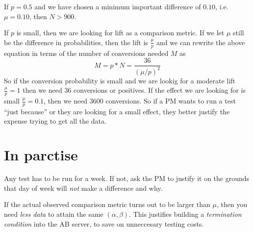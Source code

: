 \documentclass[letterpaper,12pt]{article}
\newcommand{\beq}{\begin{equation}} %
\newcommand{\eeq}{\end{equation}} %
\begin{document}
If \(p=0.5\) and we have chosen a minimum important difference of \(0.10\), i.e. \(\mu = 0.10\), then \(N>900\).

If \(p\) is small, then we are looking for lift as a comparison metric. If we let \(\mu\) still be the difference in probabilities, then the lift is \(\frac{\mu}{p}\) and we can rewrite the above equation in terms of the number of conversions needed \(M\) as
\beq
M=p*N=\frac{36}{(\mu/p)^2}
\eeq
So if the conversion probability is small and we are lookig for a
moderate lift \(\frac{\mu}{p}=1\) then we need 36 conversions or
positives. If the effect we are looking for is small
\(\frac{\mu}{p}=0.1\), then we need \(3600\) conversions. So if a PM
wants to run a test ``just because'' or they are looking for a small
effect, they better justify the expense trying to get all the data.

\section{In parctise}
Any test has to be run for a week. If not, ask the PM to justify it on the grounds that day of week will {\em not} make a difference and why.

If the actual observed comparison metric turns out to be larger than \(\mu\), then you need {\em less data} to attain the same \((\alpha,\beta)\). This justifies building a {\em termination condition} into the AB server, to save on unneccesary testing costs.
\end{document}
